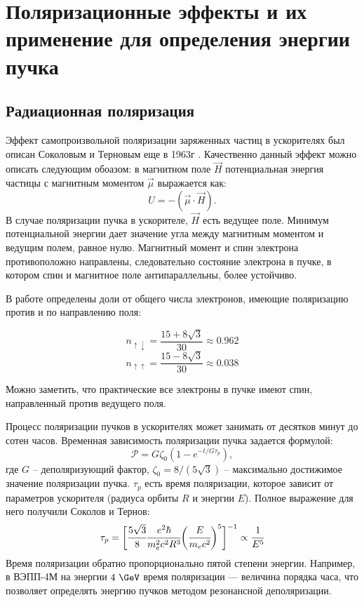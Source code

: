 \chapter{Поляризационные эффекты и их применение для определения энергии пучка}
\label{sec:respnant_dep}
\section{Радиационная поляризация}
Эффект самопроизвольной поляризации заряженных частиц в ускорителях был описан Соколовым и Терновым еще в 1963г \cite{sokolov}. Качественно данный эффект можно описать следующим обоазом: в магнитном поле $\vec{H}$ потенциальная энергия частицы с магнитным моментом  $\vec{\mu}$ выражается как: 
\begin{equation}
U = - (\vec{\mu} \cdot \vec{H}).
\end{equation} 
В случае поляризации пучка в ускорителе, $\vec{H}$ есть ведущее поле. Минимум потенциальной энергии дает значение угла между магнитным моментом и ведущим полем, равное нулю. Магнитный момент и спин электрона противоположно направлены, следовательно состояние электрона в пучке, в котором спин и магнитное поле антипараллельны, более устойчиво.
\par В работе  \cite{sokolov} определены доли от общего числа электронов, имеющие поляризацию против и по направлению поля: 
\begin{multicols}{2}
	\noindent
	\begin{equation}
	n_{\uparrow\downarrow} = \frac{15+8\sqrt{3}}{30} \approx 0.962 
	\end{equation}
	\begin{equation}
	n_{\uparrow\uparrow} = \frac{15-8\sqrt{3}}{30} \approx 0.038
	\end{equation}
\end{multicols}%
\noindent Можно заметить, что практические все электроны в пучке имеют спин, направленный против ведущего поля.
\par Процесс поляризации пучков в ускорителях может занимать от десятков минут до сотен часов. Временная зависимость поляризации пучка задается формулой: 
\begin{equation}
	\mathcal{P} = G\zeta_0(1-e^{-t/G\tau_p}),
	\label{eq:polDepOnTime}
\end{equation}
где $G$ -- деполяризующий фактор, $\zeta_0 = 8/(5\sqrt{3})$ -- максимально достижимое значение поляризации пучка. $\tau_p$ есть время поляризации, которое зависит от параметров ускорителя (радиуса орбиты $R$ и энергии $E$). Полное выражение для него получили Соколов и Тернов:
\begin{equation}
\tau_p = \biggl[\cfrac{5 \sqrt{3}}{8} \cfrac{e^2\hbar}{m_e ^2c^2 R^3} \biggl(\cfrac{E}{m_ec^2}\biggr)^5 \biggr]^{-1} \propto \cfrac{1}{E^5}
\label{eq:pol_time}
\end{equation} 
Время поляризации обратно пропорционально пятой степени энергии. Например, в ВЭПП-4М на энергии $4~\GeV$ время поляризации --- величина порядка часа, что позволяет определять энергию пучков методом резонансной деполяризации.

